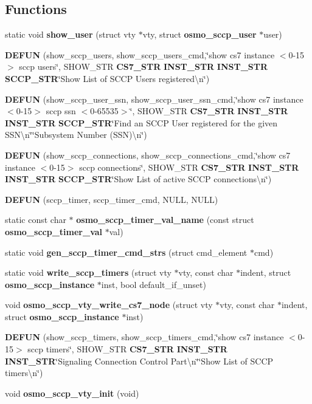 \subsection*{Functions}
\begin{DoxyCompactItemize}
\item 
static void {\bf show\+\_\+user} (struct vty $\ast$vty, struct {\bf osmo\+\_\+sccp\+\_\+user} $\ast$user)
\item 
{\bf D\+E\+F\+UN} (show\+\_\+sccp\+\_\+users, show\+\_\+sccp\+\_\+users\+\_\+cmd,\char`\"{}show cs7 instance $<$0-\/15$>$ sccp users\char`\"{}, S\+H\+O\+W\+\_\+\+S\+TR {\bf C\+S7\+\_\+\+S\+TR} {\bf I\+N\+S\+T\+\_\+\+S\+TR} {\bf I\+N\+S\+T\+\_\+\+S\+TR} {\bf S\+C\+C\+P\+\_\+\+S\+TR}\char`\"{}Show List of S\+C\+CP Users registered\textbackslash{}n\char`\"{})
\item 
{\bf D\+E\+F\+UN} (show\+\_\+sccp\+\_\+user\+\_\+ssn, show\+\_\+sccp\+\_\+user\+\_\+ssn\+\_\+cmd,\char`\"{}show cs7 instance $<$0-\/15$>$ sccp ssn $<$0-\/65535$>$\char`\"{}, S\+H\+O\+W\+\_\+\+S\+TR {\bf C\+S7\+\_\+\+S\+TR} {\bf I\+N\+S\+T\+\_\+\+S\+TR} {\bf I\+N\+S\+T\+\_\+\+S\+TR} {\bf S\+C\+C\+P\+\_\+\+S\+TR}\char`\"{}Find an S\+C\+CP User registered for the given S\+S\+N\textbackslash{}n\char`\"{}\char`\"{}Subsystem Number (S\+SN)\textbackslash{}n\char`\"{})
\item 
{\bf D\+E\+F\+UN} (show\+\_\+sccp\+\_\+connections, show\+\_\+sccp\+\_\+connections\+\_\+cmd,\char`\"{}show cs7 instance $<$0-\/15$>$ sccp connections\char`\"{}, S\+H\+O\+W\+\_\+\+S\+TR {\bf C\+S7\+\_\+\+S\+TR} {\bf I\+N\+S\+T\+\_\+\+S\+TR} {\bf I\+N\+S\+T\+\_\+\+S\+TR} {\bf S\+C\+C\+P\+\_\+\+S\+TR}\char`\"{}Show List of active S\+C\+CP connections\textbackslash{}n\char`\"{})
\item 
{\bf D\+E\+F\+UN} (sccp\+\_\+timer, sccp\+\_\+timer\+\_\+cmd, N\+U\+LL, N\+U\+LL)
\item 
static const char $\ast$ {\bf osmo\+\_\+sccp\+\_\+timer\+\_\+val\+\_\+name} (const struct {\bf osmo\+\_\+sccp\+\_\+timer\+\_\+val} $\ast$val)
\item 
static void {\bf gen\+\_\+sccp\+\_\+timer\+\_\+cmd\+\_\+strs} (struct cmd\+\_\+element $\ast$cmd)
\item 
static void {\bf write\+\_\+sccp\+\_\+timers} (struct vty $\ast$vty, const char $\ast$indent, struct {\bf osmo\+\_\+sccp\+\_\+instance} $\ast$inst, bool default\+\_\+if\+\_\+unset)
\item 
void {\bf osmo\+\_\+sccp\+\_\+vty\+\_\+write\+\_\+cs7\+\_\+node} (struct vty $\ast$vty, const char $\ast$indent, struct {\bf osmo\+\_\+sccp\+\_\+instance} $\ast$inst)
\item 
{\bf D\+E\+F\+UN} (show\+\_\+sccp\+\_\+timers, show\+\_\+sccp\+\_\+timers\+\_\+cmd,\char`\"{}show cs7 instance $<$0-\/15$>$ sccp timers\char`\"{}, S\+H\+O\+W\+\_\+\+S\+TR {\bf C\+S7\+\_\+\+S\+TR} {\bf I\+N\+S\+T\+\_\+\+S\+TR} {\bf I\+N\+S\+T\+\_\+\+S\+TR}\char`\"{}Signaling Connection Control Part\textbackslash{}n\char`\"{}\char`\"{}Show List of S\+C\+CP timers\textbackslash{}n\char`\"{})
\item 
void {\bf osmo\+\_\+sccp\+\_\+vty\+\_\+init} (void)
\end{DoxyCompactItemize}


